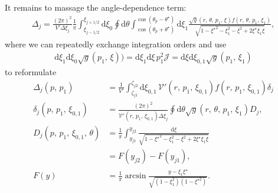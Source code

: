 \documentclass[11pt,a4paper]{article}
\newcommand{\rd}{\ensuremath{\mathrm{d}}}
\begin{document}
It remains to massage the angle-dependence term:
\begin{align}
\Delta_j =  \frac{(2\pi)^2}{V' \Delta \xi_j} \frac{1}{\pi} \int_{\xi_{j-1/2}}^{\xi_{j+1/2}}\rd \xi_0 \oint \rd\theta \int_{\cos(\theta_p+\theta^\star)}^{\cos(\theta_p-\theta^\star)}\rd \xi_1 \frac{\sqrt{g}(r,\,\theta,\,p_1,\,\xi)f(r,\,\theta,\,p_1,\,\xi_1)}{\sqrt{1-{\xi^\star}^2-\xi_1^2-\xi^2+2\xi^\star\xi_1\xi}},
\end{align}
where we can repeatedly exchange integration orders and use 
\begin{align}
\rd \xi_1 \rd \xi_0 \sqrt{g}(p_1,\,\xi)) = \rd \xi_1 \rd \xi \, p_1^2 \mathcal{J} = \rd \xi \rd \xi_{0,1}\sqrt{g}(p_1,\,\xi_1)
\end{align}
to reformulate
\begin{align}
\Delta_j(p,\,p_1) &= \frac{1}{V'}\int_{\zeta_{j1}}^{\zeta_{j2}} \rd \xi_{0,1} \, \mathcal{V}'(r,\,p_1,\,\xi_{0,1})f(r,\,p_1,\,\xi_{0,1})\delta_j \\
\delta_j(p,\,p_1,\,\xi_{0,1}) &= \frac{(2\pi)^2}{\mathcal{V}'(r,\,p_1,\,\xi_{0,1})\Delta \xi_j} \oint \rd \theta \sqrt{g}(r,\,\theta,\,p_1,\,\xi_1) D_j, \\
D_j(p,\,p_1,\,\xi_{0,1},\,\theta) &= \frac{1}{\pi}\int_{y_{j1}}^{y_{j2}}\frac{\rd\xi}{\sqrt{1-{\xi^\star}^2-\xi_1^2-\xi^2+2\xi^\star\xi_1\xi}} \nonumber \\
&= F(y_{j2}) - F(y_{j1}), \\
F(y) &= \frac{1}{\pi}\arcsin \frac{y-\xi_1\xi^\star}{\sqrt{(1-\xi_1^2)(1-\xi^{\star 2})}}.
\end{align}
\end{document}
